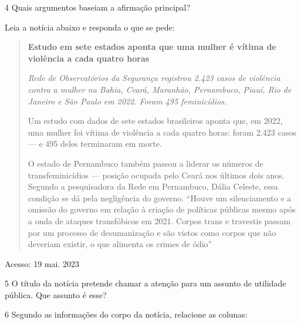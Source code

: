 {\num{4} Quais argumentos baseiam a afirmação principal?


Leia a notícia abaixo e responda o que se pede:

\begin{quote}

\textbf{Estudo em sete estados aponta que uma mulher é vítima de
violência a cada quatro horas}

\emph{Rede de Observatórios da Segurança registrou 2.423 casos de
violência contra a mulher na Bahia, Ceará, Maranhão, Pernambuco, Piauí,
Rio de Janeiro e São Paulo em 2022. Foram 495 feminicídios.}

Um estudo com dados de sete estados brasileiros aponta que, em 2022, uma
mulher foi vítima de violência a cada quatro horas: foram 2.423 casos
--- e 495 deles terminaram em morte.

O estado de Pernambuco também passou a liderar os números de
transfeminicídios --- posição ocupada pelo Ceará nos últimos dois
anos. Segundo a pesquisadora da Rede em Pernambuco, Dália Celeste, essa
condição se dá pela negligência do governo. ``Houve um silenciamento e a
omissão do governo em relação à criação de políticas públicas mesmo após
a onda de ataques transfóbicos em 2021. Corpos trans e travestis passam
por um processo de desumanização e são vistos como corpos que não
deveriam existir, o que alimenta os crimes de ódio'' 

\end{quote}

Acesso: 19 mai. 2023}

\num{5} O título da notícia pretende chamar a atenção para um assunto de utilidade pública. Que assunto é esse?


\num{6} Segundo as informações do corpo da notícia, relacione as colunas:

